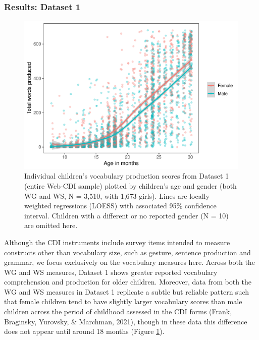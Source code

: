 \documentclass[
  english,
  ,man,floatsintext]{apa6}
\begin{document}
\hypertarget{results-dataset-1}{%
\subsubsection{Results: Dataset 1}\label{results-dataset-1}}

\begin{figure}
\centering
\includegraphics{webcdi_paper_files/figure-latex/genderfig-1.pdf}
\caption{\label{fig:genderfig}Individual children's vocabulary production scores from Dataset 1 (entire Web-CDI sample) plotted by children's age and gender (both WG and WS, N = 3,510, with 1,673 girls). Lines are locally weighted regressions (LOESS) with associated 95\% confidence interval. Children with a different or no reported gender (N = 10) are omitted here.}
\end{figure}

Although the CDI instruments include survey items intended to measure constructs other than vocabulary size, such as gesture, sentence production and grammar, we focus exclusively on the vocabulary measures here. Across both the WG and WS measures, Dataset 1 shows greater reported vocabulary comprehension and production for older children. Moreover, data from both the WG and WS measures in Dataset 1 replicate a subtle but reliable pattern such that female children tend to have slightly larger vocabulary scores than male children across the period of childhood assessed in the CDI forms (Frank, Braginsky, Yurovsky, \& Marchman, 2021), though in these data this difference does not appear until around 18 months (Figure \ref{fig:genderfig}).
\end{document}
